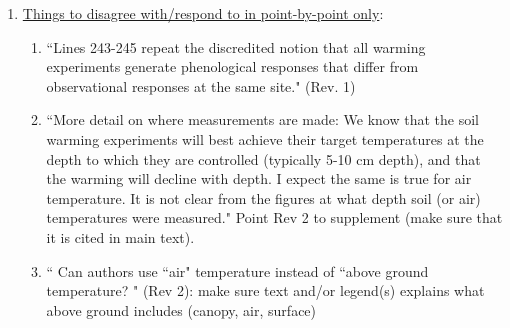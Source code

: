\documentclass[12pt,a4paper]{article}
\begin{document}
\begin{enumerate}
\begin{enumerate}
\end{enumerate}
\item  {\underline {Things to disagree with/respond to in point-by-point only}:}\\
\begin{enumerate}
\item ``Lines 243-245 repeat the discredited notion that all warming experiments generate phenological responses that differ from observational responses at the same site." (Rev. 1)
\item ``More detail on where measurements are made:  We know that the soil warming experiments will best achieve their target temperatures at the depth to which they are controlled (typically 5-10 cm depth), and that the warming will decline with depth.  I expect the same is true for air temperature. It is not clear from the figures at what depth soil (or air) temperatures were measured." Point Rev 2 to supplement (make sure that it is cited in main text).
\item `` Can authors use ``air" temperature instead of ``above ground temperature? " (Rev 2): make sure text and/or legend(s) explains what above ground includes (canopy, air, surface)
 \end{enumerate}


 
\end{enumerate}
\end{document}
